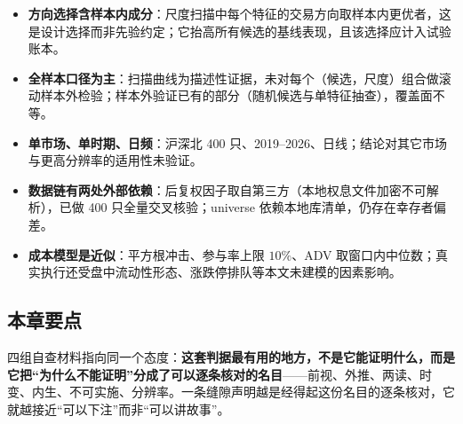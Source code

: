 \begin{itemize}
  \item \textbf{方向选择含样本内成分}：尺度扫描中每个特征的交易方向取样本内更优者，这是设计选择而非先验约定；它抬高所有候选的基线表现，且该选择应计入试验账本。
  \item \textbf{全样本口径为主}：扫描曲线为描述性证据，未对每个（候选，尺度）组合做滚动样本外检验；样本外验证已有的部分（随机候选与单特征抽查），覆盖面不等。
  \item \textbf{单市场、单时期、日频}：沪深北 400 只、2019--2026、日线；结论对其它市场与更高分辨率的适用性未验证。
  \item \textbf{数据链有两处外部依赖}：后复权因子取自第三方（本地权息文件加密不可解析），已做 400 只全量交叉核验；universe 依赖本地库清单，仍存在幸存者偏差。
  \item \textbf{成本模型是近似}：平方根冲击、参与率上限 $10\%$、ADV 取窗口内中位数；真实执行还受盘中流动性形态、涨跌停排队等本文未建模的因素影响。
\end{itemize}

\subsection{本章要点}

四组自查材料指向同一个态度：\textbf{这套判据最有用的地方，不是它能证明什么，而是它把“为什么不能证明”分成了可以逐条核对的名目}——前视、外推、两读、时变、内生、不可实施、分辨率。一条缝隙声明越是经得起这份名目的逐条核对，它就越接近“可以下注”而非“可以讲故事”。